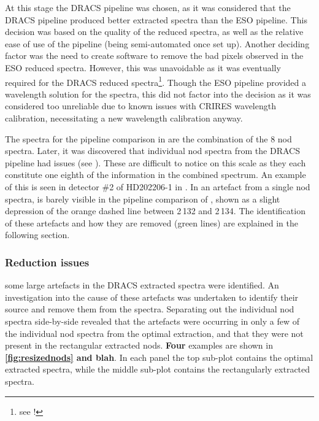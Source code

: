 At this stage the {DRACS} pipeline was chosen, as it was considered that the {DRACS} pipeline produced better extracted spectra than the {ESO} pipeline.
This decision was based on the quality of the reduced spectra, as well as the relative ease of use of the pipeline (being semi-automated once set up).
Another deciding factor was the need to create software to remove the bad pixels observed in the {ESO} reduced spectra.
However, this was unavoidable as it was eventually required for the {DRACS} reduced spectra\footnote{see !}.
Though the {ESO} pipeline provided a wavelength solution for the spectra, this did not factor into the decision as it was considered too unreliable due to known issues with {CRIRES} wavelength calibration, necessitating a new wavelength calibration anyway.

The spectra for the pipeline comparison in  are the combination of the 8 nod spectra.
Later, it was discovered that individual nod spectra from the {DRACS} pipeline had issues (see ).
These are difficult to notice on this scale as they each constitute one eighth of the information in the combined spectrum.
An example of this is seen in detector \#2 of {HD202206-1} in .
In  an artefact from a single nod spectra, is barely visible in the pipeline comparison of , shown as a slight depression of the orange dashed line between 2\,132 and 2\,134\nm{}.
The identification of these artefacts and how they are removed (green lines) are explained in the following section.

\subsubsection{Reduction issues}
\label{subsubsec:reductionartefacts}
\textbf{} some large artefacts in the {DRACS} extracted spectra were identified.
An investigation into the cause of these artefacts was undertaken to identify their source and remove them from the spectra.
Separating out the individual nod spectra side-by-side revealed that the artefacts were occurring in only a few of the individual nod spectra from the optimal extraction, and that they were not present in the rectangular extracted nods. \textbf{Four} examples are shown in \textbf{\ref{fig:resizednods} and blah}.
In each panel the top sub-plot contains the optimal extracted spectra, while the middle sub-plot contains the rectangularly extracted spectra.


